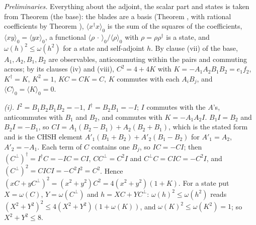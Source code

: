 \emph{Preliminaries.} Everything about the adjoint, the scalar part and states is taken from Theorem  (the base): the blades are a basis (Theorem , with rational coefficients by Theorem ), $\langle x^{\dagger}x\rangle_{0}$ is the sum of the squares of the coefficients, $\langle xy\rangle_{0} = \langle yx\rangle_{0}$, a functional $\langle\rho\,\cdot\,\rangle_{0}/\langle\rho\rangle_{0}$ with $\rho = \rho\rho^{\dagger}$ is a state, and $\omega(h)^{2} \le \omega(h^{2})$ for a state and self-adjoint $h$. By clause (vii) of the base, $A_{1}, A_{2}, B_{1}, B_{2}$ are observables, anticommuting within the pairs and commuting across; by its clauses (iv) and (viii), $C^{2} = 4 + 4K$ with $K = -A_{1}A_{2}B_{1}B_{2} = e_{1}f_{2}$, $K^{\dagger} = K$, $K^{2} = 1$, $KC = CK = C$, $K$ commutes with each $A_{i}B_{j}$, and $\langle C\rangle_{0} = \langle K\rangle_{0} = 0$.

\emph{(i).} $I^{2} = B_{1}B_{2}B_{1}B_{2} = -1$, $I^{\dagger} = B_{2}B_{1} = -I$; $I$ commutes with the $A$'s, anticommutes with $B_{1}$ and $B_{2}$, and commutes with $K = -A_{1}A_{2}I$. $B_{1}I = B_{2}$ and $B_{2}I = -B_{1}$, so $CI = A_{1}(B_{2} - B_{1}) + A_{2}(B_{2} + B_{1})$, which is the stated form and is the CHSH element $A'_{1}(B_{1} + B_{2}) + A'_{2}(B_{1} - B_{2})$ for $A'_{1} = A_{2}$, $A'_{2} = -A_{1}$. Each term of $C$ contains one $B_{j}$, so $IC = -CI$; then $(C^{\perp})^{\dagger} = I^{\dagger}C = -IC = CI$, $CC^{\perp} = C^{2}I$ and $C^{\perp}C = CIC = -C^{2}I$, and $(C^{\perp})^{2} = CICI = -C^{2}I^{2} = C^{2}$. Hence $(xC + yC^{\perp})^{2} = (x^{2} + y^{2})C^{2} = 4(x^{2} + y^{2})(1 + K)$. For a state put $X = \omega(C)$, $Y = \omega(C^{\perp})$ and $h = XC + YC^{\perp}$: $\omega(h)^{2} \le \omega(h^{2})$ reads $(X^{2} + Y^{2})^{2} \le 4(X^{2} + Y^{2})(1 + \omega(K))$, and $\omega(K)^{2} \le \omega(K^{2}) = 1$; so $X^{2} + Y^{2} \le 8$.

